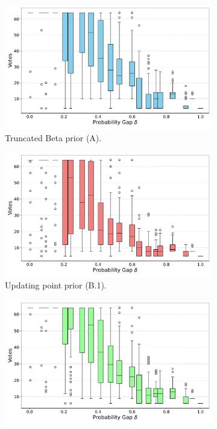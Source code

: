 \begin{figure}[h!]
  \centering
  \begin{subfigure}{0.49\textwidth}
      \centering
      \includegraphics[width=\textwidth]{figs/truncated_beta_prior_stopping_5.pdf}
      \caption{Truncated Beta prior (A).}
      \label{fig:votes_truncated_beta_prior}
  \end{subfigure}
  \hfill
  \begin{subfigure}{0.49\textwidth}
      \centering
      \includegraphics[width=\textwidth]{figs/delta_dirac_prior_stopping_5.pdf}
        \caption{Updating point prior (B.1).}
      \label{fig:votes_delta_dirac_prior}
  \end{subfigure}
  \vfill
  \vspace{8pt}
    \begin{subfigure}{0.49\textwidth}
      \centering
      \includegraphics[width=\textwidth]{figs/updating_point_prior_ratio_stopping_5.pdf}

\end{subfigure}
\end{figure}
